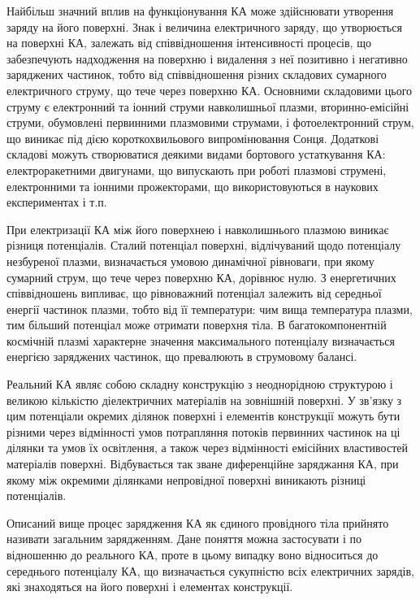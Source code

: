 \documentclass[a4paper,12pt]{article}
\begin{document}
Найбільш значний вплив на функціонування КА може здійснювати утворення заряду на його поверхні. Знак і величина електричного заряду, що утворюється на поверхні КА, залежать від співвідношення інтенсивності процесів, що забезпечують надходження на поверхню і видалення з неї позитивно і негативно заряджених частинок, тобто від співвідношення різних складових сумарного електричного струму, що тече через поверхню КА. Основними складовими цього струму є електронний та іонний струми навколишньої плазми, вторинно-емісійні струми, обумовлені первинними плазмовими струмами, і фотоелектронний струм, що виникає під дією короткохвильового випромінювання Сонця. Додаткові складові можуть створюватися деякими видами бортового устаткування КА: електроракетними двигунами, що випускають при роботі плазмові струмені, електронними та іонними прожекторами, що використовуються в наукових експериментах і т.п.

При електризації КА між його поверхнею і навколишнього плазмою виникає різниця потенціалів. Сталий потенціал поверхні, відлічуваний щодо потенціалу незбуреної плазми, визначається умовою динамічної рівноваги, при якому сумарний струм, що тече через поверхню КА, дорівнює нулю. З енергетичних співвідношень випливає, що рівноважний потенціал залежить від середньої енергії частинок плазми, тобто від її температури: чим вища температура плазми, тим більший потенціал може отримати поверхня тіла. В багатокомпонентній космічній плазмі характерне значення максимального потенціалу визначається енергією заряджених частинок, що превалюють в струмовому балансі.

Реальний КА являє собою складну конструкцію з неоднорідною структурою і великою кількістю діелектричних матеріалів на зовнішній поверхні. У зв'язку з цим потенціали окремих ділянок поверхні і елементів конструкції можуть бути різними через відмінності умов потрапляння потоків первинних частинок на ці ділянки та умов їх освітлення, а також через відмінності емісійних властивостей матеріалів поверхні. Відбувається так зване диференційне заряджання КА, при якому між окремими ділянками непровідної поверхні виникають різниці потенціалів.

Описаний вище процес зарядження КА як єдиного провідного тіла прийнято називати загальним зарядженням. Дане поняття можна застосувати і по відношенню до реального КА, проте в цьому випадку воно відноситься до середнього потенціалу КА, що визначається сукупністю всіх електричних зарядів, які знаходяться на його поверхні і елементах конструкції.
\end{document}
